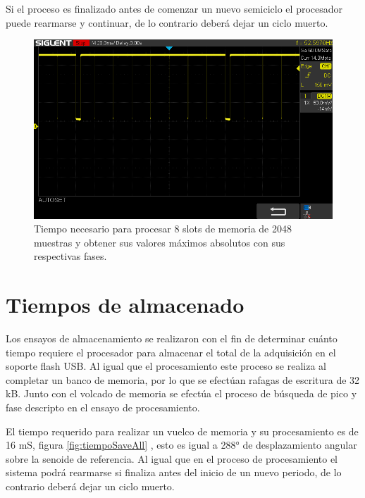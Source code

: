 Si el proceso es finalizado antes de comenzar un nuevo semiciclo el procesador puede rearmarse y continuar, de lo contrario deberá dejar un ciclo muerto.

\vspace{5mm}

\begin{figure}[ht]
	\centering
	\includegraphics[width=133mm]{./Figures/tiempoSavePatron.png}
	\caption{Tiempo necesario para procesar 8 slots de memoria de 2048 muestras y obtener sus valores máximos absolutos con sus respectivas fases.}
	\label{fig:tiempoSavePatron}
\end{figure}

\vspace{5mm}

\section{Tiempos de almacenado}

Los ensayos de almacenamiento se realizaron con el fin de determinar cuánto tiempo requiere el procesador para almacenar el total de la adquisición en el soporte flash USB. Al igual que el procesamiento este proceso se realiza al completar un banco de memoria, por lo que se efectúan rafagas de escritura de 32 kB. Junto con el volcado de memoria se efectúa el proceso de búsqueda de pico y fase descripto en el ensayo de procesamiento. 

El tiempo requerido para realizar un vuelco de memoria y su procesamiento es de 16 mS, figura \ref{fig:tiempoSaveAll} , esto es igual a 288° de desplazamiento angular sobre la senoide de referencia. Al igual que en el proceso de procesamiento el sistema podrá rearmarse si finaliza antes del inicio de un nuevo periodo, de lo contrario deberá dejar un ciclo muerto.

